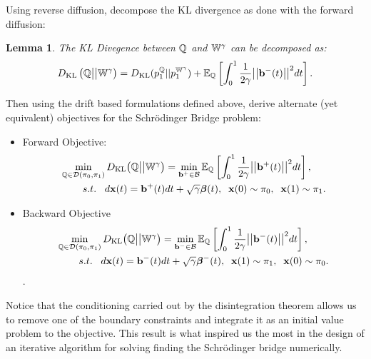 \documentclass[a4paper,12pt,twoside,openright]{report}
\newtheorem{lemma}{Lemma}
\theoremstyle{definition}
\begin{document}
Using reverse diffusion, \cite{pavon1991free} decompose the KL divergence as done with the forward diffusion:
\begin{lemma}\label{lemma:control}\citep{pavon1991free}
    The KL Divegence between ${\mathbb{Q}}$ and $\mathbb{W}^{\gamma}$ can be decomposed as:
\begin{align}\label{eq:free_energy_2}
     D_{\mathrm{KL}}\left({\mathbb{Q}} \big|\big| \mathbb{W}^{\gamma}\right) = D_{\mathrm{KL}}(p^{{\mathbb{Q}}}_1 || p_1^{ \mathbb{W}^{\gamma}}) + \mathbb{E}_{\mathbb{Q}}\left[\int_0^1\frac{1}{2\gamma} \big|\big|{\mathbf{b}}^{-}(t)\big|\big|^2 dt\right].
\end{align}
\end{lemma}
Then using the drift based formulations defined above, \cite{pavon1991free} derive alternate (yet equivalent) objectives for the Schrödinger Bridge problem:

\begin{itemize}
\item Forward Objective: 
\begin{align} \label{eq:controlled_bridge_forward}
    \min_{{\mathbb{Q}} \in {\mathcal{D}}(\pi_0, \pi_1)} D_{\mathrm{KL}}\big({\mathbb{Q}} \big|\big| \mathbb{W}^{\gamma}\big)& = \min_{{\mathbf{b}}^{+} \in {\mathcal{B}} }  \mathbb{E}_{\mathbb{Q}}\left[\int_0^1 \frac{1}{2\gamma}\big|\big|{\mathbf{b}}^{+}(t) \big|\big|^2 dt\right], \nonumber \\
    s.t.\;\;\; d{\mathbf{x}}(t) = {\mathbf{b}}^{+}(t) &dt + \sqrt{\gamma} {\bm{\beta}}(t), \;\; {\mathbf{x}}(0) \sim \pi_0, \;\; {\mathbf{x}}(1) \sim \pi_1.
\end{align}
\item Backward Objective
\begin{align} \label{eq:controlled_bridge_backward}
    \min_{{\mathbb{Q}} \in {\mathcal{D}}(\pi_0, \pi_1)} D_{\mathrm{KL}}\big({\mathbb{Q}} \big|\big| \mathbb{W}^{\gamma}\big)& = \min_{{\mathbf{b}}^{-} \in {\mathcal{B}} }  \mathbb{E}_{\mathbb{Q}}\left[\int_0^1 \frac{1}{2\gamma}\big|\big|{\mathbf{b}}^{-}(t) \big|\big|^2 dt\right], \nonumber \\
    s.t.\;\;\; d{\mathbf{x}}(t) = {\mathbf{b}}^{-}(t) &dt + \sqrt{\gamma} {\bm{\beta}}^{-}(t), \;\; {\mathbf{x}}(1) \sim \pi_1 , \;\; {\mathbf{x}}(0) \sim \pi_0.
\end{align}.
\end{itemize}
Notice that the conditioning carried out by the disintegration theorem allows us to remove one of the boundary constraints and integrate it as an initial value problem to the objective. This result is what inspired us the most in the design of an iterative algorithm for solving finding the Schrödinger bridge numerically. 
\end{document}
